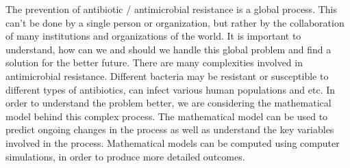 The prevention of antibiotic / antimicrobial resistance is a global process. This can't be done by a single person or organization, but rather by the collaboration of many institutions and organizations of the world. It is important to understand, how can we and should we handle this global problem and find a solution for the better future. There are many complexities involved in antimicrobial resistance. Different bacteria may be resistant or susceptible to different types of antibiotics, can infect various human populations and etc. In order to understand the problem better, we are considering the mathematical model behind this complex process. The mathematical model can be used to predict ongoing changes in the process as well as understand the key variables involved in the process. Mathematical models can be computed using computer simulations, in order to produce more detailed outcomes.
